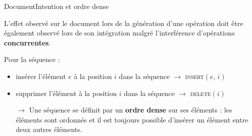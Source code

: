 \begin{frame}{Document}{Intention et ordre dense}
  
  L'effet observé sur le document lors de la génération d'une opération doit
  être également observé lors de son intégration malgré l'interférence
  d'opérations \textbf{concurrentes}.

  \vspace{1cm}


  
  Pour la séquence :
  \begin{itemize}
  \item \og insérer l'élément $e$ à la position $i$ dans la séquence \fg
    $\rightarrow$ \textsc{insert}$(e,\,i)$
  \item \small \og supprimer l'élément à la position $i$ dans la séquence \fg
    $\rightarrow$ \textsc{delete}$(i)$
  \end{itemize}


  \vspace{0.5cm}

  \begin{itemize}
  \item [$\rightarrow$] Une séquence se définit par un \textbf{ordre dense} sur
    ses éléments : les éléments sont ordonnés et il est toujours possible
    d'insérer un élément entre deux autres éléments.
  \end{itemize}

  \vspace{0.2cm}
  
\end{frame}



